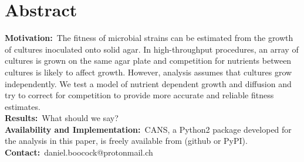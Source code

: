 \section*{Abstract}
\label{sec:abstract}

\textbf{Motivation:}~The fitness of microbial strains can be estimated
from the growth of cultures inoculated onto solid agar. In
high-throughput procedures, an array of cultures is grown on the same
agar plate and competition for nutrients between cultures is likely to
affect growth. However, analysis assumes that cultures grow
independently. We test a model of nutrient dependent growth and
diffusion and try to
correct for competition to provide more accurate and reliable fitness estimates.\\
\textbf{Results:}~What should we say?\\
\textbf{Availability and Implementation:}~CANS, a Python2 package developed for the analysis in this paper, is freely available from (github or PyPI).\\
\textbf{Contact:}~daniel.boocock@protonmail.ch\\

